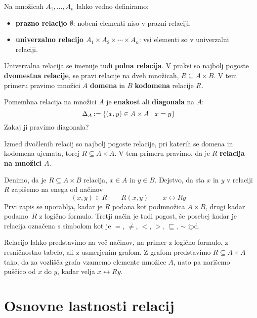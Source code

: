 Na množicah $A_1, \ldots, A_n$ lahko vedno definiramo:
%
\begin{itemize}
\item \textbf{prazno relacijo $\emptyset$}: nobeni elementi niso v prazni relaciji,
\item \textbf{univerzalno relacijo $A_1 \times A_2 \times \cdots \times A_n$}: vsi elementi so v univerzalni relaciji.
\end{itemize}
%
Univerzalna relacija se imenuje tudi \textbf{polna relacija}.
%
V praksi so najbolj pogoste \textbf{dvomestna relacije}, se pravi relacije na dveh
množicah, $R \subseteq A \times B$.
V tem primeru pravimo množici $A$ \textbf{domena} in $B$ \textbf{kodomena} relacije $R$.

Pomembna relacija na množici $A$ je \textbf{enakost} ali \textbf{diagonala} na $A$:
%
\begin{equation*}
    \diag[A] \defeq \set{ (x, y) \in A \times A \such x = y }
\end{equation*}
%
Zakaj ji pravimo diagonala?

Izmed dvočlenih relacij so najbolj pogoste relacije, pri katerih se domena in
kodomena ujemata, torej $R \subseteq A \times A$. V tem primeru pravimo, da je $R$ \textbf{relacija na množici $A$}.

Denimo, da je $R \subseteq A \times B$ relacija, $x \in A$ in $y \in B$. Dejstvo, da sta $x$ in $y$ v relaciji $R$ zapišemo na enega od načinov
%
\begin{equation*}
  (x, y) \in R
  \qquad
  R(x, y)
  \qquad
  x \rel{R} y
\end{equation*}
%
Prvi zapis se uporablja, kadar je $R$ podana kot podmnožica $A \times B$, drugi kadar
podamo~$R$ z logično formulo. Tretji način je tudi pogost, še posebej kadar je
relacija označena s simbolom kot je $=$, $\neq$, $<$, $>$, $\sqsubseteq$, $\sim$ ipd.

Relacijo lahko predstavimo na več načinov, na primer z logično formulo, z resničnostno tabelo, ali z usmerjenim grafom.
%
Z grafom predstavimo $R \subseteq A \times A$ tako, da za vozlišča grafa vzamemo
elemente množice $A$, nato pa narišemo puščico od $x$ do $y$, kadar velja $x \rel{R} y$.


\section{Osnovne lastnosti relacij}

